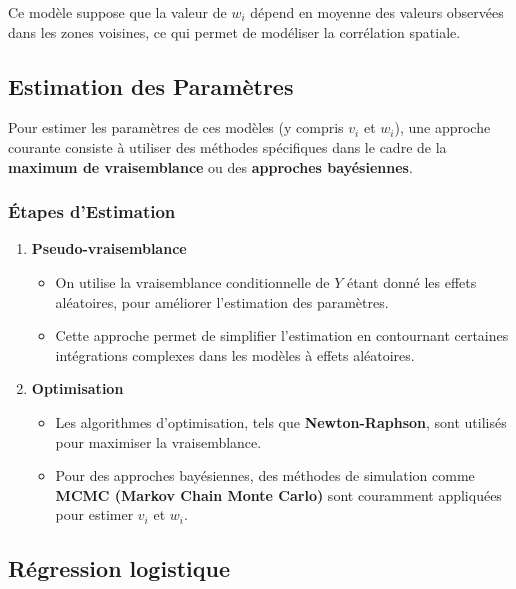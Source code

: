 \documentclass[
]{article}
\providecommand{\tightlist}{%
  \setlength{\itemsep}{0pt}\setlength{\parskip}{0pt}}
\begin{document}
Ce modèle suppose que la valeur de \(w_i\) dépend en moyenne des valeurs
observées dans les zones voisines, ce qui permet de modéliser la
corrélation spatiale.

\subsection{Estimation des
Paramètres}\label{estimation-des-paramuxe8tres}

Pour estimer les paramètres de ces modèles (y compris \(v_i\) et
\(w_i\)), une approche courante consiste à utiliser des méthodes
spécifiques dans le cadre de la \textbf{maximum de vraisemblance} ou des
\textbf{approches bayésiennes}.

\subsubsection{Étapes d'Estimation}\label{uxe9tapes-destimation}

\begin{enumerate}
\def\labelenumi{\arabic{enumi}.}
\tightlist
\item
  \textbf{Pseudo-vraisemblance}

  \begin{itemize}
  \tightlist
  \item
    On utilise la vraisemblance conditionnelle de \(Y\) étant donné les
    effets aléatoires, pour améliorer l'estimation des paramètres.
  \item
    Cette approche permet de simplifier l'estimation en contournant
    certaines intégrations complexes dans les modèles à effets
    aléatoires.
  \end{itemize}
\item
  \textbf{Optimisation}

  \begin{itemize}
  \tightlist
  \item
    Les algorithmes d'optimisation, tels que \textbf{Newton-Raphson},
    sont utilisés pour maximiser la vraisemblance.
  \item
    Pour des approches bayésiennes, des méthodes de simulation comme
    \textbf{MCMC (Markov Chain Monte Carlo)} sont couramment appliquées
    pour estimer \(v_i\) et \(w_i\).
  \end{itemize}
\end{enumerate}

\subsection{Régression logistique}\label{ruxe9gression-logistique}
\end{document}
